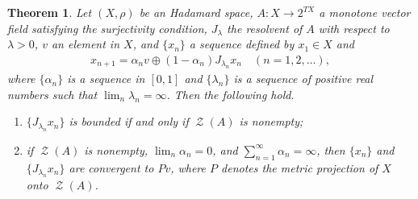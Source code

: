 \documentclass[draft]{amsart}
\numberwithin{equation}{section}
\DeclareMathOperator{\Zer}{\mathcal{Z}}
\theoremstyle{plain}
\newtheorem{theorem}{Theorem}[section]
\theoremstyle{definition}
\theoremstyle{remark}
\begin{document}
\begin{theorem}\label{thm:MPPA-CAT0-strong}
 Let $(X, \rho)$ be an Hadamard space, 
 $A\colon X\to 2^{TX}$ a monotone vector field 
 satisfying the surjectivity condition, 
 $J_{\lambda}$ the resolvent of $A$ with respect to 
 $\lambda>0$, $v$ an element in $X$, and 
 $\{x_n\}$ a sequence defined by $x_1\in X$ and 
 \begin{align}\label{eq:MPPA-CAT0-strong}
  x_{n+1} = \alpha_{n} v \oplus (1-\alpha_n) J_{\lambda_n}x_n 
  \quad (n=1,2,\dots), 
 \end{align}
 where $\{\alpha_n\}$ is a sequence in $[0,1]$ 
 and $\{\lambda_n\}$ is a sequence of positive real numbers such that 
 $\lim_{n}\lambda_n = \infty$. 
 Then the following hold. 
 \begin{enumerate}
  \item[(i)] $\{J_{\lambda_n}x_n\}$ is bounded 
 if and only if $\Zer (A)$ is nonempty; 
  \item[(ii)] if $\Zer(A)$ is nonempty, $\lim_{n}\alpha_n =0$, and 
 $\sum_{n=1}^{\infty}\alpha_n=\infty$, then 
 $\{x_n\}$ and $\{J_{\lambda_n}x_n\}$ are convergent to $Pv$, where 
 $P$ denotes the metric projection of $X$ onto $\Zer(A)$. 
 \end{enumerate}
\end{theorem}
\end{document}
